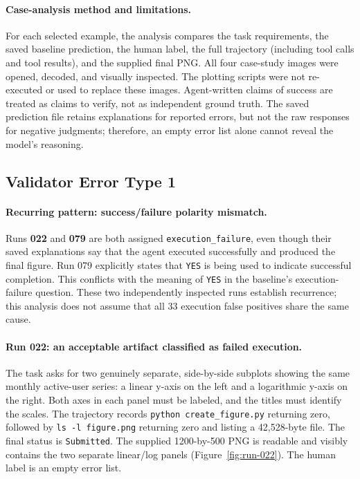 \documentclass[11pt]{article}
\begin{document}
\paragraph{Case-analysis method and limitations.}
For each selected example, the analysis compares the task requirements,
the saved baseline prediction, the human label, the full trajectory
(including tool calls and tool results), and the supplied final PNG.
All four case-study images were opened, decoded, and visually inspected.
The plotting scripts were not re-executed or used to replace these images.
Agent-written claims of success are treated as claims to verify, not as
independent ground truth. The saved prediction file retains explanations
for reported errors, but not the raw responses for negative judgments;
therefore, an empty error list alone cannot reveal the model's reasoning.

\subsection{Validator Error Type 1}
\label{sec:error-one}

\paragraph{Recurring pattern: success/failure polarity mismatch.}
Runs \textbf{022} and \textbf{079} are both assigned
\texttt{execution\_failure}, even though their saved explanations say that
the agent executed successfully and produced the final figure. Run 079
explicitly states that \texttt{YES} is being used to indicate successful
completion. This conflicts with the meaning of \texttt{YES} in the baseline's
execution-failure question.
These two independently inspected runs establish recurrence; this analysis
does not assume that all 33 execution false positives share the same cause.

\paragraph{Run 022: an acceptable artifact classified as failed execution.}
The task asks for two genuinely separate, side-by-side subplots showing
the same monthly active-user series: a linear y-axis on the left and a
logarithmic y-axis on the right. Both axes in each panel must be labeled,
and the titles must identify the scales.
The trajectory records \texttt{python create\_figure.py} returning zero,
followed by \texttt{ls -l figure.png} returning zero and listing a
42,528-byte file. The final status is \texttt{Submitted}.
The supplied 1200-by-500 PNG is readable and visibly contains the two
separate linear/log panels (Figure~\ref{fig:run-022}).
The human label is an empty error list.
\end{document}
